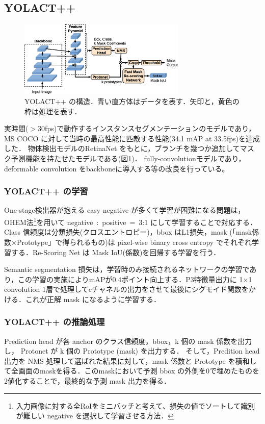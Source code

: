 \documentclass[twocolumn]{jsarticle} %
\begin{document}
\subsection{YOLACT++ \cite{BZXL20}}
\begin{figure}[tb]
    \begin{center}
        \includegraphics[width=8cm,clip]{fig/archi_YOLACT++.eps}
    \end{center}
    \caption{ YOLACT++ の構造．青い直方体はデータを表す．矢印と，黄色の枠は処理を表す．}
    \label{fig:archi_yolactpp}
\end{figure}  
実時間(${>}$30fps)で動作するインスタンスセグメンテーションのモデルであり，MS COCO に対して当時の最高性能に匹敵する性能(34.1 mAP at 33.5fps)を達成した．
物体検出モデルのRetinaNet\cite{LGGHD17} をもとに，ブランチを幾つか追加してマスク予測機能を持たせたモデルである(図\ref{fig:archi_yolactpp})．
fully-convolutionモデルであり，deformable convolution をbackboneに導入する等の改良を行っている。
\subsubsection{YOLACT++ の学習}
One-stage検出器が抱える easy negative が多くて学習が困難になる問題は，OHEM法\footnote[3]{入力画像に対する全RoIをミニバッチと考えて、損失の値でソートして識別が難しい negative を選択して学習させる方法．}を用いて negative~:~positive~=~3:1 にして学習することで対応する．
Class 信頼度は分類損失(クロスエントロピー)，bbox はL1損失，mask (「mask係数×Prototype」で得られるもの)は pixel-wise binary cross entropy でそれぞれ学習する．Re-Scoring Net は Mask IoU(係数)を回帰する学習を行う．

Semantic segmentation 損失は，学習時のみ接続されるネットワークの学習であり，この学習の実施によりmAPが0.4ポイント向上する．P3特徴量出力に 1{$\times$}1 convolution 1層で処理してcチャネルの出力をさせて最後にシグモイド関数をかける．これが正解 mask になるように学習する．

\subsubsection{YOLACT++ の推論処理}
Prediction head が各 anchor のクラス信頼度，bbox，k 個の mask 係数を出力し，
Protonet が k 個の Prototype (mask) を出力する．
そして，Predition head 出力を NMS 処理して選ばれた結果に対して，mask 係数と Prototype を積和して全画面のmaskを得る．このmaskにおいて予測 bbox の外側を0で埋めたものを2値化することで，最終的な予測 mask 出力を得る．
\end{document}
